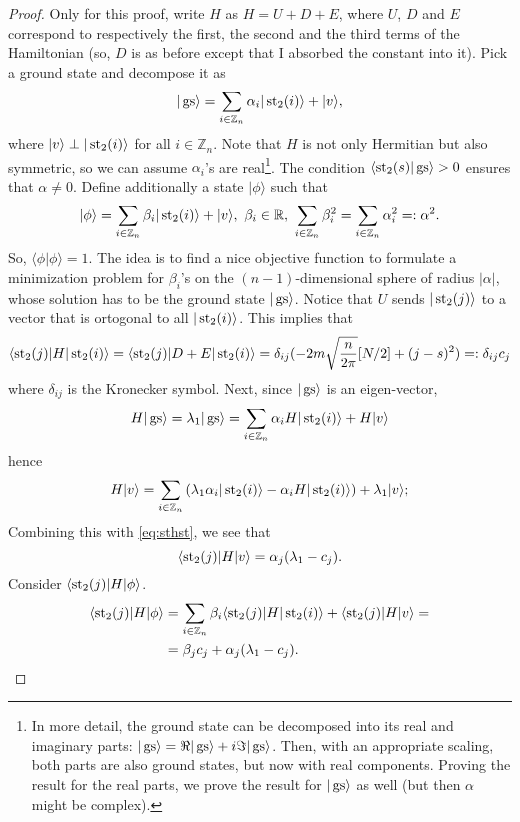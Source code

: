 \begin{proof}
Only for this proof, write $H$ as $H = U + D + E$, where $U$, $D$ and $E$ correspond to respectively the first, the second and the third terms of the Hamiltonian (so, $D$ is as before except that I absorbed the constant into it). Pick a ground state and decompose it as 
\[
|\operatorname{gs} \rangle = \sum_{i \in \mathbb Z_n} \alpha_i |\operatorname{st}_2(i)\rangle + |v\rangle,
\]
where $|v\rangle \perp |\operatorname{st}_2(i)\rangle$ for all $i \in \mathbb Z_n$. Note that $H$ is not only Hermitian but also symmetric, so we can assume $\alpha_i$'s are real\footnote{In more detail, the ground state can be decomposed into its real and imaginary parts: $|\operatorname{gs}\rangle = \Re|\operatorname{gs}\rangle + i \Im |\operatorname{gs}\rangle$. Then, with an appropriate scaling, both parts are also ground states, but now with real components. Proving the result for the real parts, we prove the result for $|\operatorname{gs}\rangle$ as well (but then $\alpha$ might be complex).}. The condition $\langle \operatorname{st}_2(s)|\operatorname{gs} \rangle > 0$ ensures that $\alpha \neq 0$. Define additionally a state $|\phi \rangle$ such that
\[
|\phi\rangle = \sum_{i \in \mathbb Z_n} \beta_i | \operatorname{st}_2(i)\rangle + |v\rangle, \ \beta_i \in \mathbb R, \ \sum_{i\in \mathbb Z_n}\beta_i^2 = \sum_{i\in \mathbb Z_n} \alpha_i^2 =: \alpha^2.
\]
So, $\langle \phi | \phi \rangle = 1$. The idea is to find a nice objective function to formulate a minimization problem for $\beta_i$'s on the $(n-1)$-dimensional sphere of radius $|\alpha|$, whose solution has to be the ground state $|\operatorname{gs}\rangle$. Notice that $U$ sends $|\operatorname{st}_2(j)\rangle$ to a vector that is ortogonal to all $|\operatorname{st}_2(i)\rangle$. This implies that
\begin{equation}\label{eq:sthst}
\langle \operatorname{st}_2(j) | H| \operatorname{st}_2(i) \rangle = \langle \operatorname{st}_2(j)|D+E|\operatorname{st}_2(i)\rangle = \delta_{ij}(-2m\sqrt{\frac{n}{2\pi}}[N/2] + (j-s)^2) =:\delta_{ij}c_j
\end{equation}
where $\delta_{ij}$ is the Kronecker symbol.  Next, since $|\operatorname{gs}\rangle$ is an eigen-vector,
\[
H|\operatorname{gs}\rangle = \lambda_1 |\operatorname{gs}\rangle = \sum_{i \in \mathbb Z_n} \alpha_i H|\operatorname{st}_2(i)\rangle + H|v\rangle
\]
hence
\[
H|v\rangle = \sum_{i \in \mathbb Z_n}\left(\lambda_1\alpha_i |\operatorname{st}_2(i)\rangle - \alpha_iH|\operatorname{st}_2(i)\rangle\right) +\lambda_1|v\rangle;
\]
Combining this with \eqref{eq:sthst}, we see that
\[
\langle \operatorname{st}_2(j) | H|v \rangle = \alpha_j(\lambda_1 - c_j).
\]
Consider $\langle \operatorname{st}_2(j) |H|\phi\rangle$.
\[\begin{split}
\langle \st_2(j) |H|\phi\rangle& = \sum_{i \in \mathbb Z_n}\beta_i\langle \st_2(j) |H|\st_2(i)\rangle + \langle \st_2(j) | H | v \rangle = \\ &= \beta_jc_j + \alpha_j(\lambda_1-c_j).

\end{split}\]
\end{proof}
